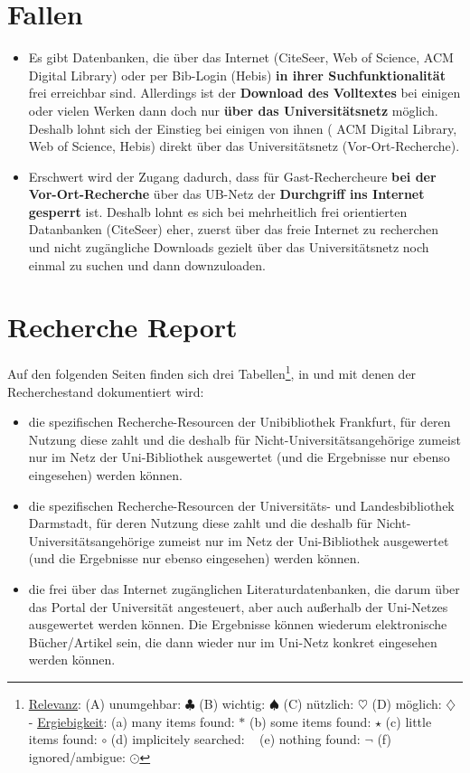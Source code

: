 \documentclass[DIV=calc,BCOR=5mm,11pt,headings=small,oneside,abstract=false, toc=bib]{scrartcl}
\begin{document}
\section{Fallen}
\begin{itemize}
  \item Es gibt Datenbanken, die über das Internet (CiteSeer, Web of
  Science, ACM Digital Library) oder per Bib-Login (Hebis) {\bfseries in ihrer
  Suchfunktionalität} frei erreichbar sind. Allerdings ist der \textbf{Download des
  Volltextes} bei einigen oder vielen Werken dann doch nur \textbf{über das
  Universitätsnetz} möglich. Deshalb lohnt sich der Einstieg bei einigen von
  ihnen ( ACM Digital Library, Web of Science, Hebis) direkt über das
  Universitätsnetz (Vor-Ort-Recherche).
  \item Erschwert wird der Zugang dadurch, dass für Gast-Rechercheure
  \textbf{bei der Vor-Ort-Recherche} über das UB-Netz der \textbf{Durchgriff
  ins Internet gesperrt} ist.
  Deshalb lohnt es sich bei mehrheitlich frei orientierten Datanbanken
  (CiteSeer) eher, zuerst über das freie Internet zu recherchen und nicht
  zugängliche Downloads gezielt über das Universitätsnetz noch einmal zu suchen
  und dann downzuloaden.
\end{itemize}

\section{Recherche Report}

Auf den folgenden Seiten finden sich drei
Tabellen\footnote{\underline{Relevanz}:
(A) unumgehbar: $\clubsuit$ (B) wichtig: $\spadesuit$ (C) nützlich:
$\heartsuit$ (D) möglich: $\diamondsuit$ - \underline{Ergiebigkeit}: (a) many
items found: $\ast$ (b) some items found: $\star$ (c) little items found:
$\circ$ (d) implicitely searched: ~ (e) nothing found: $\neg$ (f)
ignored/ambigue: $\odot$}, in und mit denen der Recherchestand dokumentiert wird:
\begin{itemize}
  \item die spezifischen Recherche-Resourcen der Unibibliothek Frankfurt, für
  deren Nutzung diese zahlt und die deshalb für Nicht-Universitätsangehörige
  zumeist nur im Netz der Uni-Bibliothek ausgewertet (und die Ergebnisse nur
  ebenso eingesehen) werden können.
  \item die spezifischen Recherche-Resourcen der Universitäts- und
  Landesbibliothek Darmstadt, für deren Nutzung diese zahlt und die deshalb für
  Nicht-Universitätsangehörige zumeist nur im Netz der Uni-Bibliothek
  ausgewertet (und die Ergebnisse nur ebenso eingesehen) werden können.
  \item die frei über das Internet zugänglichen Literaturdatenbanken, die darum
  über das Portal der Universität angesteuert, aber auch außerhalb der
  Uni-Netzes ausgewertet werden können. Die Ergebnisse können wiederum
  elektronische Bücher/Artikel sein, die dann wieder nur im Uni-Netz konkret
  eingesehen werden können.
\end{itemize}
\end{document}
